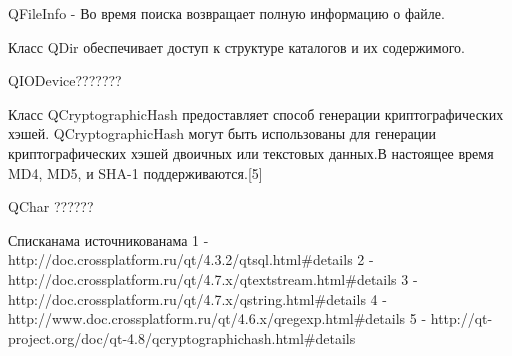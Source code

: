 QFileInfo  - Во время поиска возвращает полную информацию о файле.

Класс QDir обеспечивает доступ к структуре каталогов и их содержимого.


QIODevice???????

Класс QCryptographicHash предоставляет способ генерации криптографических хэшей.
QCryptographicHash могут быть использованы для генерации криптографических хэшей двоичных или текстовых данных.В настоящее время MD4, MD5, и SHA-1 поддерживаются.[5]

QChar ??????

Списканама источникованама
1 - http://doc.crossplatform.ru/qt/4.3.2/qtsql.html#details
2 - http://doc.crossplatform.ru/qt/4.7.x/qtextstream.html#details
3 - http://doc.crossplatform.ru/qt/4.7.x/qstring.html#details
4 - http://www.doc.crossplatform.ru/qt/4.6.x/qregexp.html#details
5 - http://qt-project.org/doc/qt-4.8/qcryptographichash.html#details